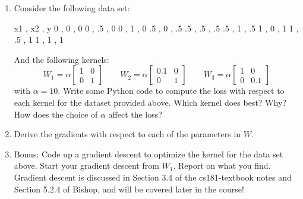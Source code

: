 \documentclass[submit]{harvardml}
\begin{document}
\begin{problem}
\begin{enumerate}
\item Consider the following data set:
\begin{csv}
x1 , x2 , y 
  0 , 0 , 0
  0 , .5 , 0
  0 , 1 , 0 
  .5 , 0 , .5
  .5 , .5 , .5
  .5 , 1 , .5
  1 , 0 , 1
  1 , .5 , 1
  1 , 1 , 1 
\end{csv}
And the following kernels:
\begin{equation*} 
W_1 = \alpha \begin{bmatrix}
  1 & 0 \\
  0 & 1 
\end{bmatrix}
\qquad
W_2 = \alpha \begin{bmatrix}
  0.1 & 0 \\
  0 & 1 
\end{bmatrix}
\qquad
W_3 = \alpha \begin{bmatrix}
  1 & 0 \\
  0 & 0.1 
\end{bmatrix}
\end{equation*} 
with $\alpha = 10$. Write some Python code to compute the loss with respect
to each kernel for the dataset provided above. Which kernel does best?  Why?  How does the choice of $\alpha$ affect the loss? 
\item Derive the gradients with respect to each of the parameters in
  $W$.
  
\item Bonus:  Code up a gradient descent to
  optimize the kernel for the data set above.  Start your gradient
  descent from $W_1$.  Report on what you find.\\
  Gradient descent is discussed in Section 3.4 of the cs181-textbook notes and Section 5.2.4 of Bishop, and will be covered later in the course! 
\end{enumerate}

\end{problem}  
\end{document}

